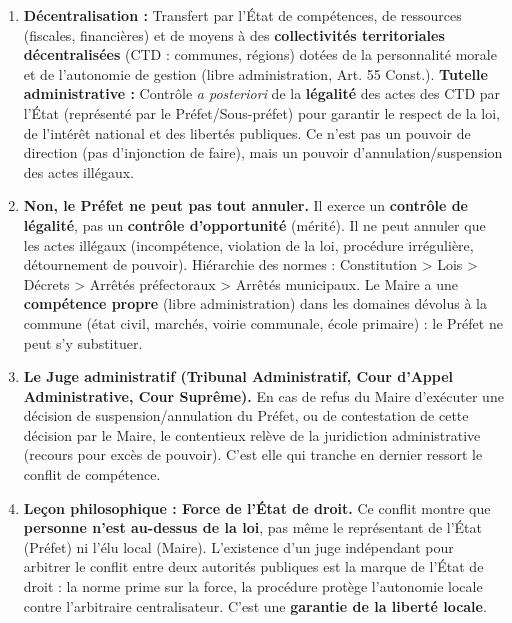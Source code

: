 \documentclass[11pt]{article}
\begin{document}
\begin{corrige}
\begin{enumerate}
\item \textbf{Décentralisation :} Transfert par l'État de compétences, de ressources (fiscales, financières) et de moyens à des \textbf{collectivités territoriales décentralisées} (CTD : communes, régions) dotées de la personnalité morale et de l'autonomie de gestion (libre administration, Art. 55 Const.). \textbf{Tutelle administrative :} Contrôle \emph{a posteriori} de la \textbf{légalité} des actes des CTD par l'État (représenté par le Préfet/Sous-préfet) pour garantir le respect de la loi, de l'intérêt national et des libertés publiques. Ce n'est pas un pouvoir de direction (pas d'injonction de faire), mais un pouvoir d'annulation/suspension des actes illégaux.
\item \textbf{Non, le Préfet ne peut pas tout annuler.} Il exerce un \textbf{contrôle de légalité}, pas un \textbf{contrôle d'opportunité} (mérité). Il ne peut annuler que les actes illégaux (incompétence, violation de la loi, procédure irrégulière, détournement de pouvoir). Hiérarchie des normes : Constitution > Lois > Décrets > Arrêtés préfectoraux > Arrêtés municipaux. Le Maire a une \textbf{compétence propre} (libre administration) dans les domaines dévolus à la commune (état civil, marchés, voirie communale, école primaire) : le Préfet ne peut s'y substituer.
\item \textbf{Le Juge administratif (Tribunal Administratif, Cour d'Appel Administrative, Cour Suprême).} En cas de refus du Maire d'exécuter une décision de suspension/annulation du Préfet, ou de contestation de cette décision par le Maire, le contentieux relève de la juridiction administrative (recours pour excès de pouvoir). C'est elle qui tranche en dernier ressort le conflit de compétence.
\item \textbf{Leçon philosophique : Force de l'État de droit.} Ce conflit montre que \textbf{personne n'est au-dessus de la loi}, pas même le représentant de l'État (Préfet) ni l'élu local (Maire). L'existence d'un juge indépendant pour arbitrer le conflit entre deux autorités publiques est la marque de l'État de droit : la norme prime sur la force, la procédure protège l'autonomie locale contre l'arbitraire centralisateur. C'est une \textbf{garantie de la liberté locale}.
\end{enumerate}
\end{corrige}
\end{document}
